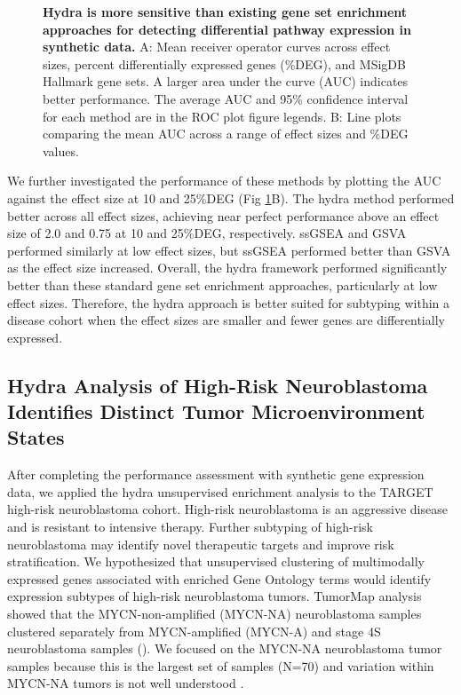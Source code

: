 \documentclass[10pt,letterpaper]{article}
\begin{document}
\begin{figure}[!h]
	\caption{{\bf Hydra is more sensitive than existing gene set enrichment approaches for detecting differential pathway expression in synthetic data.}
		A: Mean receiver operator curves across effect sizes, percent differentially expressed genes (\%DEG), and MSigDB Hallmark gene sets. A larger area under the curve (AUC) indicates better performance. The average AUC and 95\% confidence interval for each method are in the ROC plot figure legends. B: Line plots comparing the mean AUC across a range of effect sizes and \%DEG values.
		\label{rocplot}}
\end{figure}

We further investigated the performance of these methods by plotting the AUC against the effect size at 10 and 25\%DEG (Fig \ref{rocplot}B). The hydra method performed better across all effect sizes, achieving near perfect performance above an effect size of 2.0 and 0.75 at 10 and 25\%DEG, respectively. ssGSEA and GSVA performed similarly at low effect sizes, but ssGSEA performed better than GSVA as the effect size increased. Overall, the hydra framework performed significantly better than these standard gene set enrichment approaches, particularly at low effect sizes. Therefore, the hydra approach is better suited for subtyping within a disease cohort when the effect sizes are smaller and fewer genes are differentially expressed.

\subsection*{Hydra Analysis of High-Risk Neuroblastoma Identifies Distinct Tumor Microenvironment States}
After completing the performance assessment with synthetic gene expression data, we applied the hydra unsupervised enrichment analysis to the TARGET high-risk neuroblastoma cohort. High-risk neuroblastoma is an aggressive disease and is resistant to intensive therapy. Further subtyping of high-risk neuroblastoma may identify novel therapeutic targets and improve risk stratification. We hypothesized that unsupervised clustering of multimodally expressed genes associated with enriched Gene Ontology terms would identify expression subtypes of high-risk neuroblastoma tumors. TumorMap  analysis \cite{newtonTumorMapExploringMolecular2017} showed that the MYCN-non-amplified (MYCN-NA) neuroblastoma samples clustered separately from MYCN-amplified (MYCN-A) and stage 4S neuroblastoma samples (). We focused on the MYCN-NA neuroblastoma tumor samples because this is the largest set of samples (N=70) and variation within MYCN-NA tumors is not well understood \cite{morgensternChallengeDefiningUltrahighrisk2019}.
\end{document}
